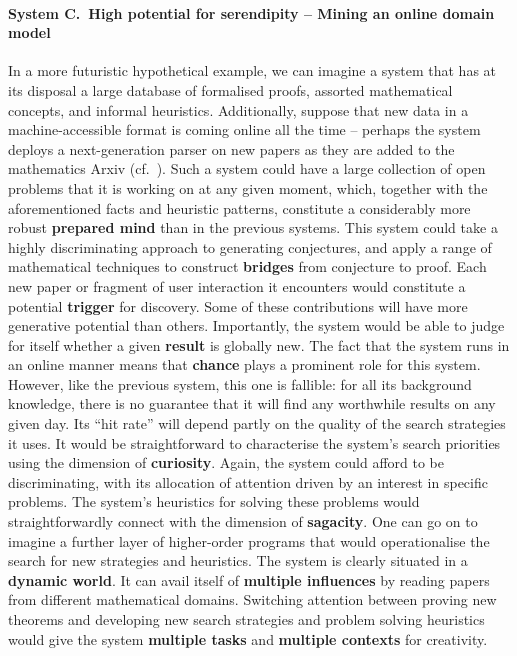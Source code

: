 \paragraph{System C.~High potential for serendipity -- Mining an online domain model} 
In a more futuristic hypothetical example, we can imagine a system that has at its
disposal a large database of formalised proofs, assorted mathematical
concepts, and informal heuristics.   
Additionally, suppose that new data in a machine-accessible format is coming online
all the time -- perhaps the system deploys a next-generation parser on
new papers as they are added to the mathematics Arxiv
(cf.~\citet{ginev2009architecture}).  Such a system could have
a large collection of open problems that it is working on at any given
moment, which, together with the aforementioned facts and heuristic patterns,
constitute a considerably more robust \textbf{prepared mind} than in
the previous systems.  This system could take a highly discriminating
approach to generating conjectures, and apply a range of mathematical
techniques to construct \textbf{bridges} from conjecture to proof.
Each new paper or fragment of user interaction it encounters would constitute
a potential \textbf{trigger} for discovery.  Some of these contributions will have
more generative potential than others.  Importantly, the system would
be able to judge for itself whether a given \textbf{result} is globally
new.  The fact that the system runs in an online manner 
means that \textbf{chance} plays a prominent role for this 
system.  However, like the previous system, this one is fallible: for
all its background knowledge, there is no guarantee that it will find
any worthwhile results on any given day.  Its ``hit rate'' will depend partly on the quality of
the search strategies it uses.  It would be straightforward to
characterise the system's search priorities using the dimension of
\textbf{curiosity}.  Again, the system could afford to be
discriminating, with its allocation of attention driven by an interest in
specific problems.
The system's heuristics for solving these problems would
straightforwardly connect with the dimension of \textbf{sagacity}.
One can go on to imagine a further layer of higher-order programs that would operationalise the search for new strategies
and heuristics.  The system is clearly situated in a \textbf{dynamic
  world}.  It can avail itself of \textbf{multiple influences} by
reading papers from different mathematical domains.  Switching
attention between proving new theorems and developing new search
strategies and problem solving heuristics would give the system
\textbf{multiple tasks} and \textbf{multiple contexts} for creativity.





